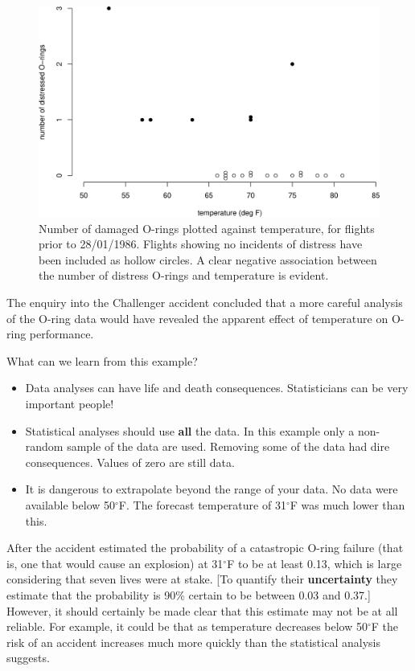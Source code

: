 \documentclass[
  11pt,
  british,
  openany, a4paper]{book}
\providecommand{\tightlist}{%
  \setlength{\itemsep}{0pt}\setlength{\parskip}{0pt}}
\begin{document}
\begin{figure}

{\centering \includegraphics[width=0.75\linewidth]{images/shuttle2} 

}

\caption{Number of damaged O-rings plotted against temperature, for flights prior to 28/01/1986. Flights showing no incidents of distress have been included as hollow circles.  A clear negative association between the number of distress O-rings and temperature is evident.}\label{fig:shuttle2}
\end{figure}

The enquiry into the Challenger accident concluded that a more careful analysis of the O-ring data would have revealed the apparent effect of temperature on O-ring performance.

What can we learn from this example?

\begin{itemize}
\tightlist
\item
  Data analyses can have life and death consequences. Statisticians can be very important people!\\
\item
  Statistical analyses should use \textbf{all} the data. In this example only a non-random sample of the data are used. Removing some of the data had dire consequences. Values of zero are still data.
\item
  It is dangerous to extrapolate beyond the range of your data. No data were available below 50\(^\circ\)F. The forecast temperature of 31\(^\circ\)F was much lower than this.
\end{itemize}

After the accident \citet{shuttle} estimated the probability of a catastropic O-ring failure (that is, one that would cause an explosion) at 31\(^\circ\)F to be at least 0.13, which is large considering that seven lives were at stake. {[}To quantify their \textbf{uncertainty} they estimate that the probability is 90\% certain to be between 0.03 and 0.37.{]} However, it should certainly be made clear that this estimate may not be at all reliable. For example, it could be that as temperature decreases below 50\(^\circ\)F the risk of an accident increases much more quickly than the statistical analysis suggests.
\end{document}
